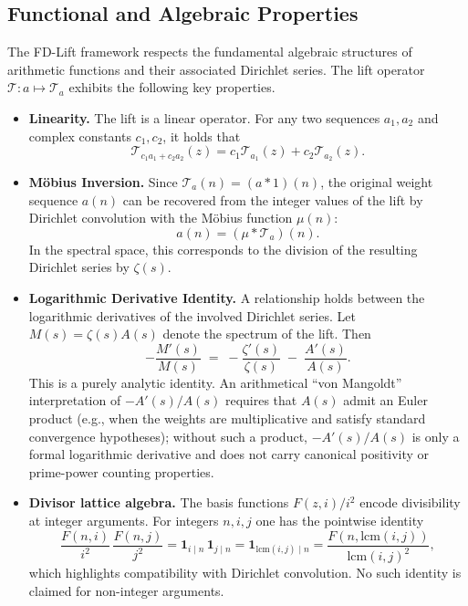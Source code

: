 \documentclass[11pt,a4paper]{amsart}
\theoremstyle{plain}
\theoremstyle{definition}
\theoremstyle{remark}
\begin{document}
\subsection{Functional and Algebraic Properties}

The FD-Lift framework respects the fundamental algebraic structures of arithmetic functions and their associated Dirichlet series. The lift operator $\mathcal{T}: a \mapsto \mathcal{T}_a$ exhibits the following key properties.

\begin{itemize}
    \item \textbf{Linearity.} The lift is a linear operator. For any two sequences $a_1, a_2$ and complex constants $c_1, c_2$, it holds that
    \[ \mathcal{T}_{c_1 a_1 + c_2 a_2}(z) = c_1 \mathcal{T}_{a_1}(z) + c_2 \mathcal{T}_{a_2}(z). \]

    \item \textbf{M\"obius Inversion.} Since $\mathcal{T}_a(n) = (a*1)(n)$, the original weight sequence $a(n)$ can be recovered from the integer values of the lift by Dirichlet convolution with the M\"obius function $\mu(n)$:
    \[ a(n) = (\mu * \mathcal{T}_a)(n). \]
    In the spectral space, this corresponds to the division of the resulting Dirichlet series by $\zeta(s)$.

    \item \textbf{Logarithmic Derivative Identity.} A relationship holds between the logarithmic derivatives of the involved Dirichlet series. Let $M(s)=\zeta(s)A(s)$ denote the spectrum of the lift. Then
    \[
    -\frac{M'(s)}{M(s)} \;=\; -\frac{\zeta'(s)}{\zeta(s)} \;-\; \frac{A'(s)}{A(s)}.
    \]
    This is a purely analytic identity. An arithmetical “von Mangoldt” interpretation of $-A'(s)/A(s)$ requires that $A(s)$ admit an Euler product (e.g., when the weights are multiplicative and satisfy standard convergence hypotheses); without such a product, $-A'(s)/A(s)$ is only a formal logarithmic derivative and does not carry canonical positivity or prime-power counting properties.

    \item \textbf{Divisor lattice algebra.} The basis functions $F(z,i)/i^2$ encode divisibility at integer arguments. For integers $n,i,j$ one has the pointwise identity
    \[
    \frac{F(n,i)}{i^2}\,\frac{F(n,j)}{j^2}=\mathbf{1}_{i\mid n}\,\mathbf{1}_{j\mid n}=\mathbf{1}_{\mathrm{lcm}(i,j)\mid n}=\frac{F(n,\mathrm{lcm}(i,j))}{\mathrm{lcm}(i,j)^2},
    \]
    which highlights compatibility with Dirichlet convolution. No such identity is claimed for non-integer arguments.
\end{itemize}
\end{document}
